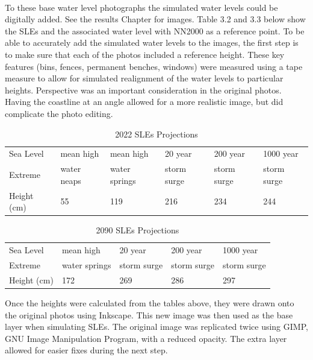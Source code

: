 \paragraph{}

To these base water level photographs the simulated water levels could be digitally added. See the results Chapter for images. Table 3.2 and 3.3 below show the SLEs and the associated water level with NN2000 as a reference point.  To be able to accurately add the simulated water levels to the images, the first step is to make sure that each of the photos included a reference height. These key features (bins, fences, permanent benches, windows) were measured using a tape measure to allow for simulated realignment of the water levels to particular heights. Perspective was an important consideration in the original photos. Having the coastline at an angle allowed for a more realistic image, but did complicate the photo editing. 

\begin{table}[h!]
    \centering
    \begin{tabular}{|l|l|l|l|l|l|}
    \hline
     Sea Level &   mean high  & mean high  & 20 year  & 200 year   & 1000 year  \\ \newline
     Extreme &  water neaps & water springs &  storm surge  & storm surge  &  storm surge  \\ \hline
       Height (cm) &  55 & 119 & 216 & 234 & 244 \\ \hline
    \end{tabular}
    \caption{2022 SLEs Projections \cite{kartverket_se_2020}}
    \label{2022_sle_projections}
\end{table}

\begin{table}[h!]
    \centering
    \begin{tabular}{|l|l|l|l|l|}
    \hline
       Sea Level &  mean high & 20 year   & 200 year &  1000 year   \\ \newline
       Extreme & water springs &  storm surge  &  storm surge  &  storm surge  \\ \hline
       Height (cm) & 172 & 269 & 286 & 297 \\ \hline
    \end{tabular}
    \caption{2090 SLEs Projections \cite{kartverket_se_2020}}
    \label{2090_sle_projections}
\end{table}

Once the heights were calculated from the tables above, they were drawn onto the original photos using Inkscape. This new image was then used as the base layer when simulating SLEs. The original image was replicated twice using GIMP, GNU Image Manipulation Program, with a reduced opacity. The extra layer allowed for easier fixes during the next step. 
